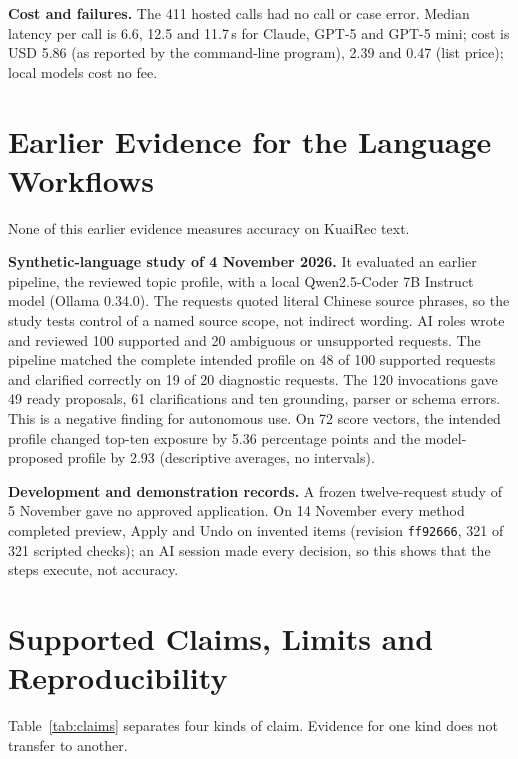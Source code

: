 \documentclass[conference]{IEEEtran}
\begin{document}
\textbf{Cost and failures.} The 411 hosted calls had no call or case error. Median latency per call is 6.6, 12.5 and 11.7\,s for Claude, GPT-5 and GPT-5 mini; cost is USD 5.86 (as reported by the command-line program), 2.39 and 0.47 (list price); local models cost no fee.

\section{Earlier Evidence for the Language Workflows}
None of this earlier evidence measures accuracy on KuaiRec text.

\textbf{Synthetic-language study of 4 November 2026.} It evaluated an earlier pipeline, the reviewed topic profile, with a local Qwen2.5-Coder 7B Instruct model (Ollama 0.34.0). The requests quoted literal Chinese source phrases, so the study tests control of a named source scope, not indirect wording. AI roles wrote and reviewed 100 supported and 20 ambiguous or unsupported requests. The pipeline matched the complete intended profile on 48 of 100 supported requests and clarified correctly on 19 of 20 diagnostic requests. The 120 invocations gave 49 ready proposals, 61 clarifications and ten grounding, parser or schema errors. This is a negative finding for autonomous use. On 72 score vectors, the intended profile changed top-ten exposure by 5.36 percentage points and the model-proposed profile by 2.93 (descriptive averages, no intervals).

\textbf{Development and demonstration records.} A frozen twelve-request study of 5 November gave no approved application. On 14 November every method completed preview, Apply and Undo on invented items (revision \texttt{ff92666}, 321 of 321 scripted checks); an AI session made every decision, so this shows that the steps execute, not accuracy.

\section{Supported Claims, Limits and Reproducibility}\label{sec:limits}
Table~\ref{tab:claims} separates four kinds of claim. Evidence for one kind does not transfer to another.
\end{document}
